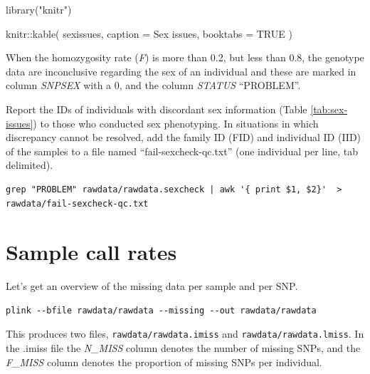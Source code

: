 \documentclass[
]{book}
\newenvironment{Shaded}{\begin{snugshade}}{\end{snugshade}}
\newcommand{\AttributeTok}[1]{\textcolor[rgb]{0.77,0.63,0.00}{#1}}
\newcommand{\ConstantTok}[1]{\textcolor[rgb]{0.00,0.00,0.00}{#1}}
\newcommand{\DecValTok}[1]{\textcolor[rgb]{0.00,0.00,0.81}{#1}}
\newcommand{\FunctionTok}[1]{\textcolor[rgb]{0.00,0.00,0.00}{#1}}
\newcommand{\NormalTok}[1]{#1}
\newcommand{\OtherTok}[1]{\textcolor[rgb]{0.56,0.35,0.01}{#1}}
\newcommand{\SpecialCharTok}[1]{\textcolor[rgb]{0.00,0.00,0.00}{#1}}
\newcommand{\StringTok}[1]{\textcolor[rgb]{0.31,0.60,0.02}{#1}}
\begin{document}
\begin{Shaded}
\begin{Highlighting}[]
\FunctionTok{library}\NormalTok{(}\StringTok{"knitr"}\NormalTok{)}

\NormalTok{knitr}\SpecialCharTok{::}\FunctionTok{kable}\NormalTok{(}
\NormalTok{  sexissues, }\AttributeTok{caption =} \StringTok{\textquotesingle{}Sex issues\textquotesingle{}}\NormalTok{,}
  \AttributeTok{booktabs =} \ConstantTok{TRUE}
\NormalTok{)}
\end{Highlighting}
\end{Shaded}

When the homozygosity rate (\emph{F}) is more than 0.2, but less than 0.8, the genotype data are inconclusive regarding the sex of an individual and these are marked in column \emph{SNPSEX} with a 0, and the column \emph{STATUS} ``PROBLEM''.

Report the IDs of individuals with discordant sex information (Table \ref{tab:sex-issues}) to those who conducted sex phenotyping. In situations in which discrepancy cannot be resolved, add the family ID (FID) and individual ID (IID) of the samples to a file named ``fail-sexcheck-qc.txt'' (one individual per line, tab delimited).

\begin{verbatim}
grep "PROBLEM" rawdata/rawdata.sexcheck | awk '{ print $1, $2}'  > rawdata/fail-sexcheck-qc.txt
\end{verbatim}

\hypertarget{sample-call-rates}{%
\section{Sample call rates}\label{sample-call-rates}}

Let's get an overview of the missing data per sample and per SNP.

\begin{verbatim}
plink --bfile rawdata/rawdata --missing --out rawdata/rawdata
\end{verbatim}

This produces two files, \texttt{rawdata/rawdata.imiss} and \texttt{rawdata/rawdata.lmiss}. In the .imiss file the \emph{N\_MISS} column denotes the number of missing SNPs, and the \emph{F\_MISS} column denotes the proportion of missing SNPs per individual.

\begin{Shaded}
\end{Shaded}
\end{document}

